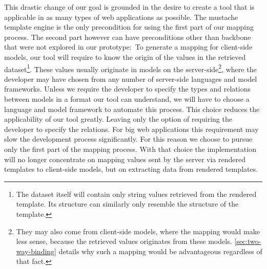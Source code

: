 \documentclass[thesis.tex]{subfiles}
\begin{document}
This drastic change of our goal is grounded in the desire to create a tool that
is applicable in as many types of web applications as possible.
The mustache template engine is the only precondition for using the first part
of our mapping process. The second part however can have preconditions
other than backbone that were not explored in our prototype:\
To generate a mapping for client-side models, our tool will require to know the
origin of the values in the retrieved dataset\footnote{
	The dataset itself will contain only string values retrieved from the rendered
	template. Its structure can similarly only resemble the structure of the
	template.
}. These values usually originate in models on the server-side\footnote{
	They may also come from client-side models, where the mapping would make less
	sense, because the retrieved values originates from these models.
	\ref{sec:two-way-binding} details why such a mapping would be advantageous
	regardless of that fact.
}, where the developer may have chosen from any number of server-side languages
and model frameworks. Unless we require the developer to specify the types and
relations between models in a format our tool can understand, we will have to
choose a language and model framework to automate this process. This choice
reduces the applicability of our tool greatly. Leaving only the option of
requiring the developer to specify the relations. For big web applications this
requirement may slow the development process significantly.
For this reason we choose to pursue only the first part of the mapping process.
With that choice the implementation will no longer concentrate on mapping values
sent by the server via rendered templates to client-side models,
but on extracting data from rendered templates.
\end{document}
